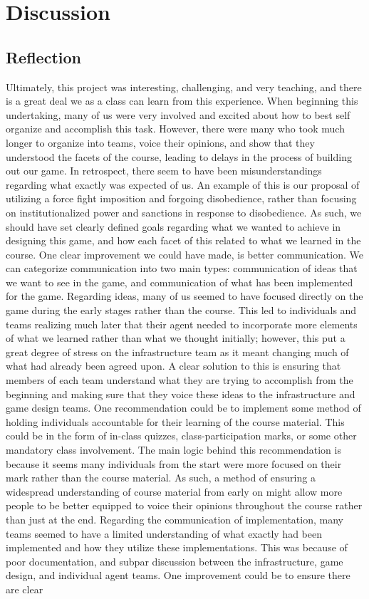 \chapter{Discussion}\label{sec:discussion}

\section{Reflection}

Ultimately, this project was interesting, challenging, and very teaching, and there is a great deal we as a class can learn from this experience. When beginning this undertaking, many of us were very involved and excited about how to best self organize and accomplish this task. However, there were many who took much longer to organize into teams, voice their opinions, and show that they understood the facets of the course, leading to delays in the process of building out our game. In retrospect, there seem to have been misunderstandings regarding what exactly was expected of us. An example of this is our proposal of utilizing a force fight imposition and forgoing disobedience, rather than focusing on institutionalized power and sanctions in response to disobedience. As such, we should have set clearly defined goals regarding what we wanted to achieve in designing this game, and how each facet of this related to what we learned in the course. One clear improvement we could have made, is better communication. We can categorize communication into two main types: communication of ideas that we want to see in the game, and communication of what has been implemented for the game. Regarding ideas, many of us seemed to have focused directly on the game during the early stages rather than the course. This led to individuals and teams realizing much later that their agent needed to incorporate more elements of what we learned rather than what we thought initially; however, this put a great degree of stress on the infrastructure team as it meant changing much of what had already been agreed upon. A clear solution to this is ensuring that members of each team understand what they are trying to accomplish from the beginning and making sure that they voice these ideas to the infrastructure and game design teams. One recommendation could be to implement some method of holding individuals accountable for their learning of the course material. This could be in the form of in-class quizzes, class-participation marks, or some other mandatory class involvement. The main logic behind this recommendation is because it seems many individuals from the start were more focused on their mark rather than the course material. As such, a method of ensuring a widespread understanding of course material from early on might allow more people to be better equipped to voice their opinions throughout the course rather than just at the end. Regarding the communication of implementation, many teams seemed to have a limited understanding of what exactly had been implemented and how they utilize these implementations. This was because of poor documentation, and subpar discussion between the infrastructure, game design, and individual agent teams. One improvement could be to ensure there are clear 